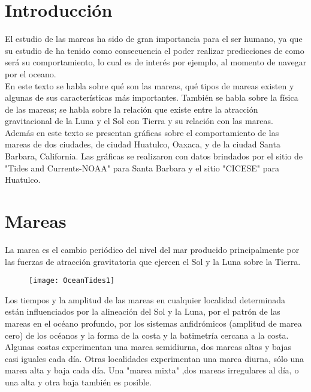\documentclass[12pt]{article}
\begin{document}
\section*{Introducción}
El estudio de las mareas ha sido de gran importancia para el ser humano, ya que su estudio de  ha tenido como consecuencia el poder realizar predicciones de como será su comportamiento, lo cual es de interés por ejemplo, al momento de navegar por el oceano. \\
En este texto se habla sobre qué son las mareas, qué tipos de mareas existen y algunas de sus características más importantes. También se habla sobre la física de las mareas; se habla sobre la relación que existe entre la atracción gravitacional de la Luna y el Sol con Tierra y su relación con las mareas. \\
Además en este texto se presentan gráficas sobre el comportamiento de las mareas de dos ciudades, de ciudad Huatulco, Oaxaca, y de la ciudad Santa Barbara, California. Las gráficas se realizaron con datos brindados por el sitio de "Tides and Currents-NOAA" para Santa Barbara y el sitio "CICESE" para Huatulco. 



\newpage
\section*{Mareas}

La marea es el cambio periódico del nivel del mar producido principalmente por las fuerzas de atracción gravitatoria que ejercen el Sol y la Luna sobre la Tierra.


\begin{figure}[ht]
\texttt{[image: OceanTides1]}
\centering

\end{figure}


Los tiempos y la amplitud de las mareas en cualquier localidad determinada están influenciados por la alineación del Sol y la Luna, por el patrón de las mareas en el océano profundo, por los sistemas anfidrómicos (amplitud de marea cero) de los océanos y la forma de la costa y la batimetría cercana a la costa. Algunas costas experimentan una marea semidiurna, dos mareas altas y bajas casi iguales cada día. Otras localidades experimentan una marea diurna, sólo una marea alta y baja cada día. Una "marea mixta" ,dos mareas irregulares al día, o una alta y otra baja también es posible.
\end{document}
